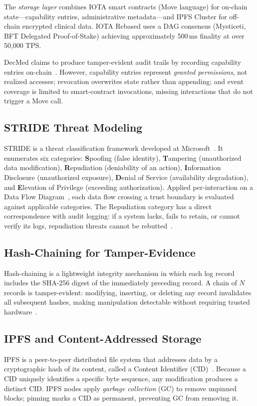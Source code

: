 The \emph{storage layer} combines IOTA smart contracts (Move language)
for on-chain state---capability entries, administrative metadata---and IPFS
Cluster for off-chain encrypted clinical data. IOTA Rebased uses a DAG
consensus (Mysticeti, BFT Delegated Proof-of-Stake) achieving approximately
500\,ms finality at over 50{,}000 TPS.

DecMed claims to produce tamper-evident audit trails by recording
capability entries on-chain~\cite{DecMed}. However, capability entries
represent \emph{granted permissions}, not realized accesses; revocation
overwrites state rather than appending; and event coverage is limited to
smart-contract invocations, missing interactions that do not trigger a Move
call.

\subsection{STRIDE Threat Modeling}

STRIDE is a threat classification framework developed at
Microsoft~\cite{shostack2014}. It enumerates six categories:
\textbf{S}poofing (false identity), \textbf{T}ampering (unauthorized data
modification), \textbf{R}epudiation (deniability of an action),
\textbf{I}nformation Disclosure (unauthorized exposure), \textbf{D}enial of
Service (availability degradation), and \textbf{E}levation of Privilege
(exceeding authorization). Applied per-interaction on a Data Flow
Diagram~\cite{owasp_threat_modeling}, each data flow crossing a trust
boundary is evaluated against applicable categories. The Repudiation
category has a direct correspondence with audit logging: if a system lacks,
fails to retain, or cannot verify its logs, repudiation threats cannot be
rebutted~\cite{shostack2014}.

\subsection{Hash-Chaining for Tamper-Evidence}

Hash-chaining is a lightweight integrity mechanism in which each log record
includes the SHA-256 digest of the immediately preceding record. A chain
of $N$ records is tamper-evident: modifying, inserting, or deleting any
record invalidates all subsequent hashes, making manipulation detectable
without requiring trusted hardware~\cite{nist800_92}.

\subsection{IPFS and Content-Addressed Storage}

IPFS is a peer-to-peer distributed file system that addresses data by a
cryptographic hash of its content, called a Content Identifier
(CID)~\cite{benet2014ipfscontentaddressed}. Because a CID uniquely
identifies a specific byte sequence, any modification produces a distinct
CID. IPFS nodes apply \emph{garbage collection} (GC) to remove
unpinned blocks; pinning marks a CID as permanent, preventing GC from
removing it.